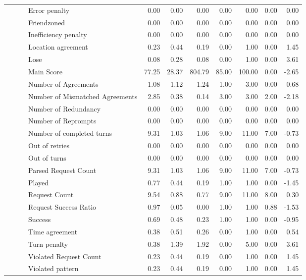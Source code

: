 \begin{tabular}{llllrrrrrrr}
 &  &  & Error penalty & 0.00 & 0.00 & 0.00 & 0.00 & 0.00 & 0.00 & 0.00 \\
 &  &  & Friendzoned & 0.00 & 0.00 & 0.00 & 0.00 & 0.00 & 0.00 & 0.00 \\
 &  &  & Inefficiency penalty & 0.00 & 0.00 & 0.00 & 0.00 & 0.00 & 0.00 & 0.00 \\
 &  &  & Location agreement & 0.23 & 0.44 & 0.19 & 0.00 & 1.00 & 0.00 & 1.45 \\
 &  &  & Lose & 0.08 & 0.28 & 0.08 & 0.00 & 1.00 & 0.00 & 3.61 \\
 &  &  & Main Score & 77.25 & 28.37 & 804.79 & 85.00 & 100.00 & 0.00 & -2.65 \\
 &  &  & Number of Agreements & 1.08 & 1.12 & 1.24 & 1.00 & 3.00 & 0.00 & 0.68 \\
 &  &  & Number of Mismatched Agreements & 2.85 & 0.38 & 0.14 & 3.00 & 3.00 & 2.00 & -2.18 \\
 &  &  & Number of Redundancy & 0.00 & 0.00 & 0.00 & 0.00 & 0.00 & 0.00 & 0.00 \\
 &  &  & Number of Reprompts & 0.00 & 0.00 & 0.00 & 0.00 & 0.00 & 0.00 & 0.00 \\
 &  &  & Number of completed turns & 9.31 & 1.03 & 1.06 & 9.00 & 11.00 & 7.00 & -0.73 \\
 &  &  & Out of retries & 0.00 & 0.00 & 0.00 & 0.00 & 0.00 & 0.00 & 0.00 \\
 &  &  & Out of turns & 0.00 & 0.00 & 0.00 & 0.00 & 0.00 & 0.00 & 0.00 \\
 &  &  & Parsed Request Count & 9.31 & 1.03 & 1.06 & 9.00 & 11.00 & 7.00 & -0.73 \\
 &  &  & Played & 0.77 & 0.44 & 0.19 & 1.00 & 1.00 & 0.00 & -1.45 \\
 &  &  & Request Count & 9.54 & 0.88 & 0.77 & 9.00 & 11.00 & 8.00 & 0.30 \\
 &  &  & Request Success Ratio & 0.97 & 0.05 & 0.00 & 1.00 & 1.00 & 0.88 & -1.53 \\
 &  &  & Success & 0.69 & 0.48 & 0.23 & 1.00 & 1.00 & 0.00 & -0.95 \\
 &  &  & Time agreement & 0.38 & 0.51 & 0.26 & 0.00 & 1.00 & 0.00 & 0.54 \\
 &  &  & Turn penalty & 0.38 & 1.39 & 1.92 & 0.00 & 5.00 & 0.00 & 3.61 \\
 &  &  & Violated Request Count & 0.23 & 0.44 & 0.19 & 0.00 & 1.00 & 0.00 & 1.45 \\
 &  &  & Violated pattern & 0.23 & 0.44 & 0.19 & 0.00 & 1.00 & 0.00 & 1.45 \\

\end{tabular}
